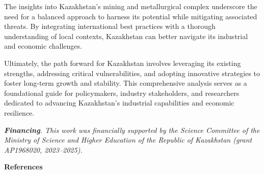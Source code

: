 \begin{multicols}{2}
The insights into Kazakhstan's mining and metallurgical complex
underscore the need for a balanced approach to harness its potential
while mitigating associated threats. By integrating international best
practices with a thorough understanding of local contexts, Kazakhstan
can better navigate its industrial and economic challenges.

Ultimately, the path forward for Kazakhstan involves leveraging its
existing strengths, addressing critical vulnerabilities, and adopting
innovative strategies to foster long-term growth and stability. This
comprehensive analysis serves as a foundational guide for policymakers,
industry stakeholders, and researchers dedicated to advancing
Kazakhstan's industrial capabilities and economic resilience.

\emph{{\bfseries Financing}. This work was financially supported by the
Science Committee of the Ministry of Science and Higher Education of the
Republic of Kazakhstan (grant AP1968020, 2023--2025).}
\end{multicols}

\begin{center}
{\bfseries References}
\end{center}


